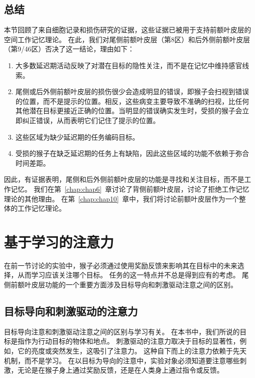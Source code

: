 \subsection{总结}

本节回顾了来自细胞记录和损伤研究的证据，这些证据已被用于支持前额叶皮层的空间工作记忆理论\cite{goldman1996prefrontal}。
在此，我们对尾侧前额叶皮层（第8区）和后外侧前额叶皮层（第9/46区）否决了这一结论，理由如下：


\begin{enumerate}
	\item 大多数延迟期活动反映了对潜在目标的隐性关注，而不是在记忆中维持感官线索。
	\item 尾侧或后外侧前额叶皮层的损伤很少会造成明显的错误，即猴子会扫视到错误的位置，而不是提示的位置。相反，这些病变主要导致不准确的扫视，比任何其他潜在目标更接近正确的位置。当明显的错误确实发生时，受损的猴子会立即纠正错误，从而表明它们记住了提示的位置。
	\item 这些区域为缺少延迟期的任务编码目标。
	\item 受损的猴子在缺乏延迟期的任务上有缺陷，因此这些区域的功能不依赖于弥合时间差距。
\end{enumerate}
因此，有证据表明，尾侧和后外侧前额叶皮层的功能是寻找和关注目标，而不是工作记忆。
我们在第~\ref{chap:chap6}~章讨论了背侧前额叶皮层，讨论了拒绝工作记忆理论的其他理由。
在第~\ref{chap:chap10}~章中，我们将讨论前额叶皮层作为一个整体的工作记忆理论。



\section{基于学习的注意力}

在前一节讨论的实验中，猴子必须通过使用奖励反馈来影响其在目标中的未来选择，从而学习应该关注哪个目标。
任务的这一特点并不总是得到应有的考虑。
尾侧前额叶皮层功能的一个重要方面涉及目标导向和刺激驱动注意之间的区别。


\subsection{目标导向和刺激驱动的注意力}

目标导向注意和刺激驱动注意之间的区别与学习有关。
在本书中，我们所说的目标是指作为行动目标的物体和地点。
刺激驱动的注意力取决于目标的显著性，例如，它的亮度或突然发生，这吸引了注意力。
这种自下而上的注意力依赖于先天机制，而不是学习。
在以目标为导向的注意中，实验对象必须知道要注意哪些刺激，无论是在猴子身上通过奖励反馈，还是在人类身上通过指令或反馈。


